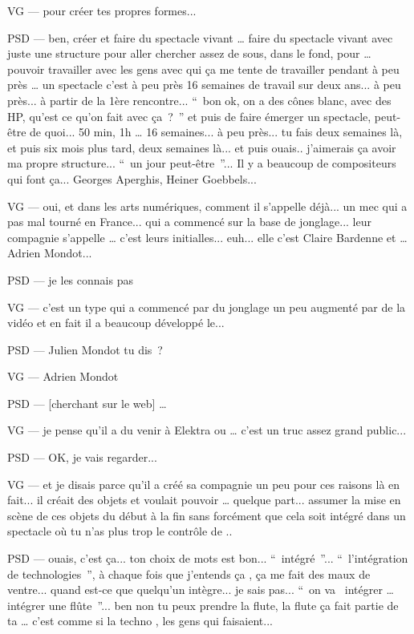 VG — pour créer tes propres formes... 

PSD — ben, créer et faire du spectacle vivant … faire du spectacle vivant avec juste une structure pour aller chercher assez de sous, dans le fond, pour … pouvoir travailler avec les gens avec qui ça me tente de travailler pendant à peu près … un spectacle c'est à peu près 16 semaines de travail sur deux ans... à peu près... à partir de la 1ère rencontre... “ bon ok, on a des cônes blanc, avec des HP, qu'est ce qu'on fait avec ça ? ” et puis de faire émerger un spectacle, peut-être de quoi... 50 min, 1h … 16 semaines... à peu près... tu fais deux semaines là,  et puis six mois plus tard, deux semaines là... et puis ouais.. j'aimerais ça avoir ma propre structure... “ un jour peut-être ”... Il y a beaucoup de compositeurs qui font ça... Georges Aperghis, Heiner Goebbels... 

VG — oui, et dans les arts numériques, comment il s'appelle déjà... un mec qui a pas mal tourné en France... qui a commencé sur la base de jonglage... leur compagnie s'appelle … c'est leurs initialles... euh... elle c'est Claire Bardenne et … Adrien Mondot... 

PSD — je les connais pas 

VG — c'est un type qui a commencé par du jonglage un peu  augmenté par de la vidéo et en fait il a beaucoup développé le... 

PSD — Julien Mondot tu dis ? 

VG — Adrien Mondot  

PSD — [cherchant sur le web] … 

VG — je pense qu'il a du venir à Elektra ou … c'est un truc assez grand public... 

PSD — OK, je vais regarder... 

VG — et je disais parce qu'il a créé sa compagnie un peu pour ces raisons là en fait... il créait des objets et voulait pouvoir … quelque part... assumer la mise en scène de ces objets du début à la fin sans forcément que cela soit intégré dans un spectacle où tu n'as plus trop le contrôle de .. 

PSD — ouais, c'est ça... ton choix de mots est bon... “ intégré ”... “ l'intégration de technologies ”,  à chaque fois que j'entends ça , ça me fait des maux de ventre... quand est-ce que quelqu'un intègre... je sais pas... “ on va  intégrer … intégrer une flûte ”... ben non tu peux prendre la flute, la flute ça fait partie de ta … c'est comme si la techno , les gens qui faisaient... 

